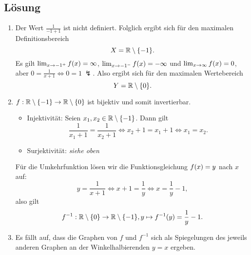 \documentclass[german,12pt]{homework}
\newcommand{\RR}{\mathbb{R}}
\DeclarePairedDelimiter{\enbrace}{(}{)}
\DeclarePairedDelimiter{\penbrace}{\{}{\}}
\begin{document}
    \subsection*{Lösung}
    \begin{enumerate}
        \item Der Wert \(\frac{1}{-1 + 1}\) ist nicht definiert. Folglich
        ergibt sich für den maximalen Definitionsbereich
        \[X = \RR \setminus \penbrace*{-1}.\]
        Es gilt \(\lim_{x \to -1^+}f\enbrace*{x} = \infty\), \(\lim_{x \to -1^-}
        f\enbrace*{x} = -\infty\) und \(\lim_{x \to \infty}f\enbrace*{x} = 0\),
        aber \(0 = \frac{1}{x + 1} \iff 0 = 1\ \lightning\). Also ergibt sich
        für den maximalen Wertebereich
        \[Y = \RR \setminus \penbrace*{0}.\]
        \item \(f: \RR \setminus \penbrace*{-1} \to \RR \setminus
        \penbrace*{0}\) ist bijektiv und somit invertierbar.
        \begin{itemize}
            \item Injektivität: Seien \(x_1, x_2 \in \RR \setminus
            \penbrace*{-1}\). Dann gilt
            \[\frac{1}{x_1 + 1} = \frac{1}{x_2 + 1} \iff x_2 + 1 = x_1 + 1 \iff
            x_1 = x_2.\]
            \item Surjektivität: \emph{siehe oben}
        \end{itemize}
        Für die Umkehrfunktion lösen wir die Funktionsgleichung \(f\enbrace*{x}
        = y\) nach \(x\) auf:
        \[y = \frac{1}{x + 1} \iff x + 1 = \frac{1}{y} \iff x = \frac{1}{y} -
        1,\]
        also gilt
        \[f^{-1}: \RR \setminus \penbrace*{0} \to \RR \setminus \penbrace*{-1},
        y \mapsto f^{-1}\enbrace*{y} = \frac{1}{y} - 1.\]
        \item Es fällt auf, dass die Graphen von \(f\) und \(f^{-1}\) sich als
        Spiegelungen des jeweils anderen Graphen an der Winkelhalbierenden \(y
        = x\) ergeben.
        \begin{center}
\end{center}
\end{enumerate}
\end{document}
